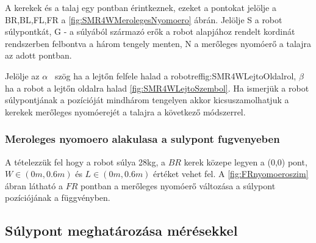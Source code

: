A kerekek és a talaj egy pontban érintkeznek, ezeket a pontokat jelölje a BR,BL,FL,FR a \ref{fig:SMR4WMerolegesNyomoero} ábrán. Jelölje S a robot súlypontkát, G - a súlyából származó erők a robot alapjához rendelt kordinát rendszerben felbontva a három tengely menten, N a merőleges nyomóerő a talajra az adott pontban.

\renewcommand{\img}{SajatRobot/SzerkAbrak/MerolegesNyomoEro.jpg}
\renewcommand{\sources}{*}
\renewcommand{\captionn}{Merőleges nyomóerő a talajra $4W-SSMR$ típusú robot esetében.}
\renewcommand{\figlabel}{SMR4WMerolegesNyomoero}


Jelölje az $\alpha$ \ szög ha a lejtőn felfele halad a robotref{fig:SMR4WLejtoOldalrol}, $\beta$  ha a robot a lejtőn oldalra halad \ref{fig:SMR4WLejtoSzembol}. 
Ha ismerjük a robot súlypontjának a pozícióját mindhárom tengelyen akkor kicsuszamolhatjuk a kerekek merőleges nyomóerejét a talajra a következő módszerrel.



\renewcommand{\img}{SajatRobot/SzerkAbrak/LejtoOldalrol.jpg}
\renewcommand{\sources}{*}
\renewcommand{\captionn}{$4W-SSMR$ típusú robot lejtőn felfele oldal nézetből.}
\renewcommand{\aspectratioPic}{0.5}
\renewcommand{\figlabel}{SMR4WLejtoOldalrol}


\renewcommand{\img}{SajatRobot/SzerkAbrak/LejtoSzembol.png}
\renewcommand{\sources}{*}
\renewcommand{\captionn}{$4W-SSMR$ típusú robot lejtőn első nézetből.}
\renewcommand{\aspectratioPic}{0.5}
\renewcommand{\figlabel}{SMR4WLejtoSzembol}




\subsubsection{Meroleges nyomoero alakulasa a sulypont fugvenyeben}

A tételezzük fel hogy a robot súlya 28kg, a $BR$ kerek közepe legyen a (0,0) pont, $W\in(0m,0.6m)$ és $L\in(0m,0.6m)$ értéket vehet fel.
A \ref{fig:FRnyomoeroszim} ábran látható a $FR$ pontban a merőleges nyomóerő változása a súlypont pozíciójának a függvényben.




\subsection{Súlypont meghatározása mérésekkel}

